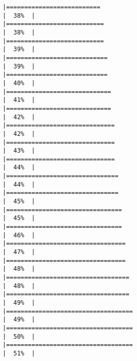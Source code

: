 \documentclass[
]{article}
\begin{document}
\begin{verbatim}
|==========================                                            |  38%  |                                                                              |===========================                                           |  38%  |                                                                              |===========================                                           |  39%  |                                                                              |============================                                          |  39%  |                                                                              |============================                                          |  40%  |                                                                              |=============================                                         |  41%  |                                                                              |=============================                                         |  42%  |                                                                              |==============================                                        |  42%  |                                                                              |==============================                                        |  43%  |                                                                              |==============================                                        |  44%  |                                                                              |===============================                                       |  44%  |                                                                              |===============================                                       |  45%  |                                                                              |================================                                      |  45%  |                                                                              |================================                                      |  46%  |                                                                              |=================================                                     |  47%  |                                                                              |=================================                                     |  48%  |                                                                              |==================================                                    |  48%  |                                                                              |==================================                                    |  49%  |                                                                              |===================================                                   |  49%  |                                                                              |===================================                                   |  50%  |                                                                              |===================================                                   |  51%  |                                                                              
\end{verbatim}
\end{document}
